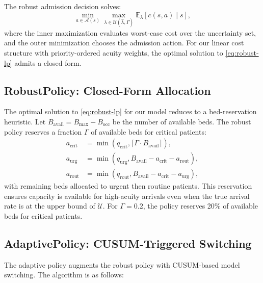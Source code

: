\documentclass[11pt,twocolumn]{article}
\theoremstyle{plain}
\theoremstyle{definition}
\begin{document}
The robust admission decision solves:
\begin{equation}
\min_{a \in \mathcal{A}(s)} \max_{\lambda \in \mathcal{U}(\hat{\lambda}, \Gamma)} \mathbb{E}_\lambda[c(s, a) \mid s],
\label{eq:robust-lp}
\end{equation}
where the inner maximization evaluates worst-case cost over the uncertainty set, and the outer minimization chooses the admission action. For our linear cost structure with priority-ordered acuity weights, the optimal solution to \eqref{eq:robust-lp} admits a closed form.

\subsection{RobustPolicy: Closed-Form Allocation}

The optimal solution to \eqref{eq:robust-lp} for our model reduces to a bed-reservation heuristic. Let $B_{\text{avail}} = B_{\max} - B_{\text{occ}}$ be the number of available beds. The robust policy reserves a fraction $\Gamma$ of available beds for critical patients:
\begin{align}
a_{\text{crit}} &= \min(q_{\text{crit}}, \lceil \Gamma \cdot B_{\text{avail}} \rceil), \\
a_{\text{urg}} &= \min(q_{\text{urg}}, B_{\text{avail}} - a_{\text{crit}} - a_{\text{rout}}), \\
a_{\text{rout}} &= \min(q_{\text{rout}}, B_{\text{avail}} - a_{\text{crit}} - a_{\text{urg}}),
\label{eq:robust-policy}
\end{align}
with remaining beds allocated to urgent then routine patients. This reservation ensures capacity is available for high-acuity arrivals even when the true arrival rate is at the upper bound of $\mathcal{U}$. For $\Gamma = 0.2$, the policy reserves 20\% of available beds for critical patients.

\subsection{AdaptivePolicy: CUSUM-Triggered Switching}

The adaptive policy augments the robust policy with CUSUM-based model switching. The algorithm is as follows:
\end{document}
